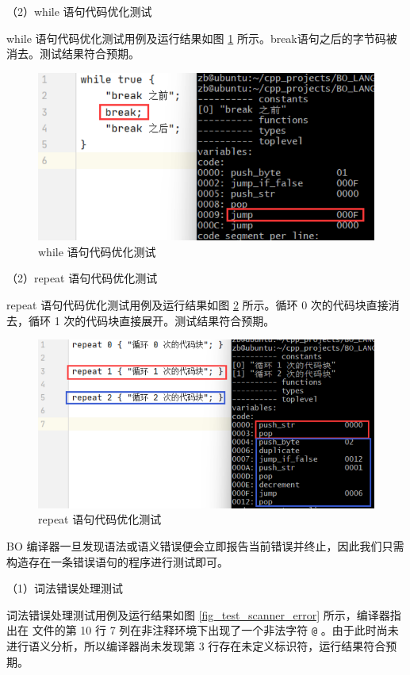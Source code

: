 （2）while 语句代码优化测试

while 语句代码优化测试用例及运行结果如图 \ref{test_optimizer3} 所示。break语句之后的字节码被消去。测试结果符合预期。

\begin{figure}[H]
\centering
\includegraphics{figure/test_optimizer3.pdf}
\caption{while 语句代码优化测试}
\label{test_optimizer3}
\end{figure}

（2）repeat 语句代码优化测试

repeat 语句代码优化测试用例及运行结果如图 \ref{test_optimizer4} 所示。循环 0 次的代码块直接消去，循环 1 次的代码块直接展开。测试结果符合预期。

\begin{figure}[H]
\centering
\includegraphics{figure/test_optimizer4.pdf}
\caption{repeat 语句代码优化测试}
\label{test_optimizer4}
\end{figure}


 BO 编译器一旦发现语法或语义错误便会立即报告当前错误并终止，因此我们只需构造存在一条错误语句的程序进行测试即可。

（1）词法错误处理测试

词法错误处理测试用例及运行结果如图 \ref{fig_test_scanner_error} 所示，编译器指出在  文件的第 10 行 7 列在非注释环境下出现了一个非法字符 \verb!@! 。由于此时尚未进行语义分析，所以编译器尚未发现第 3 行存在未定义标识符，运行结果符合预期。


